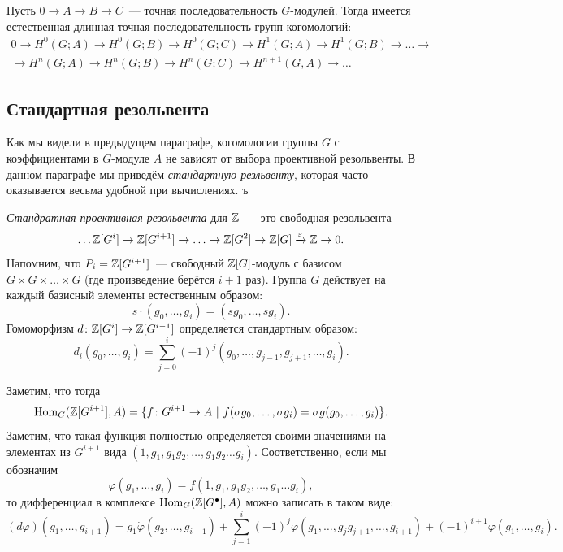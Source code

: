 	\begin{theorem} 
		Пусть $0 \to A \to B \to C$~--- точная последовательность $G$-модулей. Тогда имеется естественная длинная точная последовательность групп когомологий:
		\begin{multline*}
			0 \to H^{0}(G; A) \to H^{0}(G; B) \to H^{0}(G; C) \to H^{1}(G; A) \to H^{1}(G; B) \to \ldots \to \\ \to H^{n}(G; A) \to H^{n}(G; B) \to H^{n}(G; C) \to H^{n + 1}(G, A) \to \ldots
		\end{multline*}
	\end{theorem}

	\subsection{Стандартная резольвента}

	Как мы видели в предыдущем параграфе, когомологии группы $G$ с коэффициентами в $G$-модуле $A$ не зависят от выбора проективной резольвенты. В данном параграфе мы приведём \emph{стандартную резльвенту}, которая часто оказывается весьма удобной при вычислениях. ъ

	\begin{definition} 
		\emph{Стандратная проективная резольвента } для $\mathbb{Z}$~--- это свободная резольвента 
		\[
			\ldots \mathbb{Z}[G^{i}] \to \mathbb{Z}[G^{i + 1}] \to \ldots \to \mathbb{Z}[G^2] \to \mathbb{Z}[G] \xrightarrow{\varepsilon} \mathbb{Z} \to 0.
		\]
		Напомним, что $P_i = \mathbb{Z}[G^{i + 1}]$~--- свободный $\mathbb{Z}[G]$-модуль с базисом $G \times G \times \ldots \times G$ (где произведение берётся $i + 1$ раз). Группа $G$ действует на каждый базисный элементы естественным образом: 
		\[
		 	s \cdot (g_0, \ldots, g_i) = (s g_0, \ldots, s g_i).
		 \] 
		 Гомоморфизм $d\colon \mathbb{Z}[G^i] \to \mathbb{Z}[G^{i - 1}]$ определяется стандартным образом: 
		 \[
		 	d_i(g_0, \ldots, g_i) = \sum_{j = 0}^{i} (-1)^j (g_0, \ldots, g_{j - 1}, g_{j + 1}, \ldots, g_{i}). 
		 \]
 	\end{definition}

 	Заметим, что тогда 
 	\[
 		\operatorname{Hom}_{G}(\mathbb{Z}[G^{i + 1}], A) = \{ f \colon G^{i + 1} \to A \ \vert \  f(\sigma g_0, \ldots, \sigma g_i) = \sigma g(g_0, \ldots, g_i) \}. 
 	\]
 	Заметим, что такая функция полностью определяется своими значениями на элементах из $G^{i + 1}$ вида $(1, g_1, g_1 g_2, \ldots, g_1 g_2 \ldots g_i)$. Соответственно, если мы обозначим 
 	\[
 		\varphi(g_1, \ldots, g_i) = f(1, g_1, g_1 g_2, \ldots, g_1 \ldots g_i),
 	\]
 	то дифференциал в комплексе $\operatorname{Hom}_{G}(\mathbb{Z}[G^{\bullet}], A)$ можно записать в таком виде: 
 	\[
 		(d\varphi)(g_1, \ldots, g_{i + 1}) = g_1 \dot \varphi(g_2, \ldots, g_{i + 1}) + \sum_{j = 1}^i (-1)^j \varphi(g_1, \ldots, g_{j} g_{j + 1}, \ldots, g_{i + 1}) + (-1)^{i + 1} \varphi(g_1, \ldots, g_i). 
 	\]

